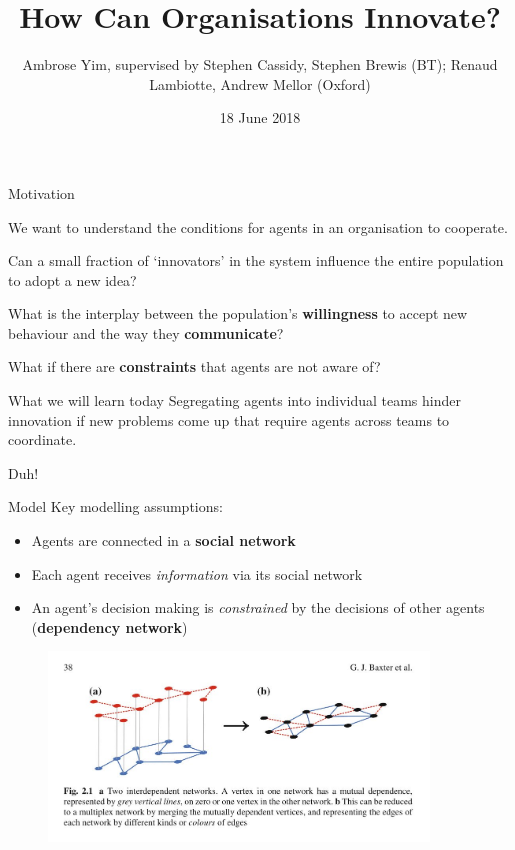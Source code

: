 \documentclass[10pt, xcolor=dvipsnames, handout]{beamer}
\title{How Can Organisations Innovate?}
\date{18 June 2018}
\author{Ambrose Yim, supervised by Stephen Cassidy, Stephen Brewis (BT); Renaud Lambiotte, Andrew Mellor (Oxford)}
\institute{InFoMM CDT, Mathematical Institute, University of Oxford}
\begin{document}
\maketitle

\begin{frame}{Motivation}

We want to understand the conditions for agents in an organisation to cooperate.

\pause Can a small fraction of `innovators' in the system influence the entire population to adopt a new idea?

\pause What is the interplay between the population's \textbf{willingness} to accept new behaviour and the way they \textbf{communicate}?

\pause What if there are \textbf{constraints} that agents are not aware of?
\end{frame}

\begin{frame}{What we will learn today}
Segregating agents into individual teams hinder innovation if new problems come up that require agents across teams to coordinate.

\pause Duh!
\end{frame}

\begin{frame}{Model}
Key modelling assumptions:
\begin{itemize}
\pause \item Agents are connected in a \textbf{social network} \cite{wang_social_2018} \cite{granell_dynamical_2013}
\pause \item Each agent receives \emph{information} via its social network
\pause \item An agent's decision making is \emph{constrained} by the decisions of other agents (\textbf{dependency network})
\end{itemize}

\end{frame}

\begin{frame}

\begin{figure}[htb]
\includegraphics[width=0.9\textwidth]{figures/multiplex.jpeg}
\end{figure}
\end{frame}
\end{document}
